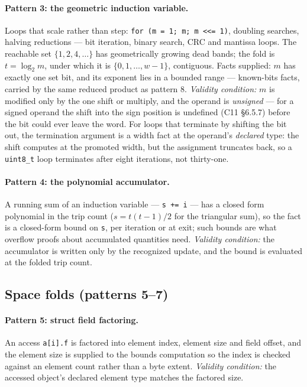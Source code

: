\documentclass[11pt,a4paper]{article}
\begin{document}
\paragraph{Pattern 3: the geometric induction variable.} Loops that scale rather than
step: \texttt{for (m = 1; m; m <<= 1)}, doubling searches, halving reductions --- bit
iteration, binary search, CRC and mantissa loops. The reachable set $\{1, 2, 4, \dots\}$
has geometrically growing dead bands; the fold is $t = \log_2 m$, under which it is
$\{0, 1, \dots, w{-}1\}$, contiguous. Facts supplied: $m$ has exactly one set bit, and
its exponent lies in a bounded range --- known-bits facts, carried by the same reduced
product as pattern 8. \emph{Validity condition:} $m$ is modified only by the one shift or
multiply, and the operand is \emph{unsigned} --- for a signed operand the shift into the
sign position is undefined (C11 \S6.5.7) before the bit could ever leave the word. For
loops that terminate by shifting the bit out, the termination argument is a width fact at
the operand's \emph{declared} type: the shift computes at the promoted width, but the
assignment truncates back, so a \texttt{uint8\_t} loop terminates after eight iterations,
not thirty-one.

\paragraph{Pattern 4: the polynomial accumulator.} A running sum of an induction
variable --- \texttt{s += i} --- has a closed form polynomial in the trip count
($s = t(t{-}1)/2$ for the triangular sum), so the fact is a closed-form bound on
\texttt{s}, per iteration or at exit; such bounds are what overflow proofs about
accumulated quantities need. \emph{Validity condition:} the accumulator is written only
by the recognized update, and the bound is evaluated at the folded trip count.

\subsection{Space folds (patterns 5--7)}

\paragraph{Pattern 5: struct field factoring.} An access \texttt{a[i].f} is factored
into element index, element size and field offset, and the element size is supplied to
the bounds computation so the index is checked against an element count rather than a
byte extent. \emph{Validity condition:} the accessed object's declared element type
matches the factored size.
\end{document}
